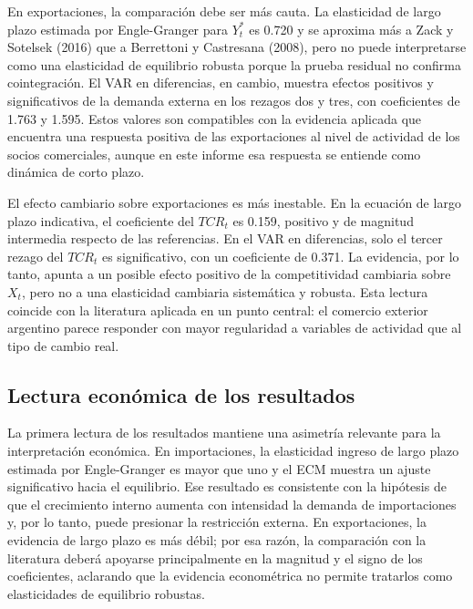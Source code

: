 \documentclass[11pt,a4paper]{article}
\begin{document}
	En exportaciones, la comparación debe ser más cauta. La elasticidad de largo
	plazo estimada por Engle-Granger para \(Y_t^*\) es 0.720 y se aproxima más a
	Zack y Sotelsek (2016) que a Berrettoni y Castresana (2008), pero no puede
	interpretarse como una elasticidad de equilibrio robusta porque la prueba
	residual no confirma cointegración. El VAR en diferencias, en cambio, muestra
	efectos positivos y significativos de la demanda externa en los rezagos dos y
	tres, con coeficientes de 1.763 y 1.595. Estos valores son compatibles con la
	evidencia aplicada que encuentra una respuesta positiva de las exportaciones al
	nivel de actividad de los socios comerciales, aunque en este informe esa
	respuesta se entiende como dinámica de corto plazo.
	
	El efecto cambiario sobre exportaciones es más inestable. En la ecuación de
	largo plazo indicativa, el coeficiente del \(TCR_t\) es 0.159, positivo y de
	magnitud intermedia respecto de las referencias. En el VAR en diferencias, solo
	el tercer rezago del \(TCR_t\) es significativo, con un coeficiente de 0.371.
	La evidencia, por lo tanto, apunta a un posible efecto positivo de la
	competitividad cambiaria sobre \(X_t\), pero no a una elasticidad cambiaria
	sistemática y robusta. Esta lectura coincide con la literatura aplicada en un
	punto central: el comercio exterior argentino parece responder con mayor
	regularidad a variables de actividad que al tipo de cambio real.
	
	\subsection{Lectura económica de los resultados}
	\label{subsec:comparacion-lectura-economica}
	
	La primera lectura de los resultados mantiene una asimetría relevante para la
	interpretación económica. En importaciones, la elasticidad ingreso de largo
	plazo estimada por Engle-Granger es mayor que uno y el ECM muestra un ajuste
	significativo hacia el equilibrio. Ese resultado es consistente con la hipótesis
	de que el crecimiento interno aumenta con intensidad la demanda de importaciones
	y, por lo tanto, puede presionar la restricción externa. En exportaciones, la
	evidencia de largo plazo es más débil; por esa razón, la comparación con la
	literatura deberá apoyarse principalmente en la magnitud y el signo de los
	coeficientes, aclarando que la evidencia econométrica no permite tratarlos como
	elasticidades de equilibrio robustas.
	
\end{document}
